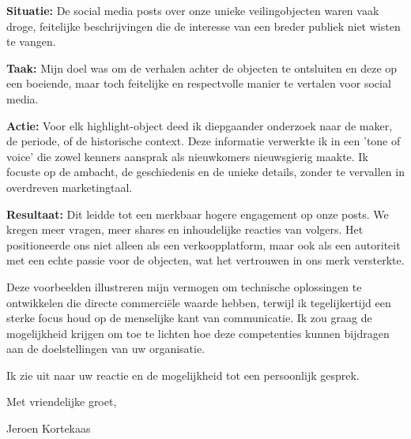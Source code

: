 \documentclass[11pt,a4paper]{article}
\begin{document}
\textbf{Situatie:} De social media posts over onze unieke veilingobjecten waren vaak droge, feitelijke beschrijvingen die de interesse van een breder publiek niet wisten te vangen.

\textbf{Taak:} Mijn doel was om de verhalen achter de objecten te ontsluiten en deze op een boeiende, maar toch feitelijke en respectvolle manier te vertalen voor social media.

\textbf{Actie:} Voor elk highlight-object deed ik diepgaander onderzoek naar de maker, de periode, of de historische context. Deze informatie verwerkte ik in een 'tone of voice' die zowel kenners aansprak als nieuwkomers nieuwsgierig maakte. Ik focuste op de ambacht, de geschiedenis en de unieke details, zonder te vervallen in overdreven marketingtaal.

\textbf{Resultaat:} Dit leidde tot een merkbaar hogere engagement op onze posts. We kregen meer vragen, meer shares en inhoudelijke reacties van volgers. Het positioneerde ons niet alleen als een verkoopplatform, maar ook als een autoriteit met een echte passie voor de objecten, wat het vertrouwen in ons merk versterkte.

\vspace{2em}

Deze voorbeelden illustreren mijn vermogen om technische oplossingen te ontwikkelen die directe commerciële waarde hebben, terwijl ik tegelijkertijd een sterke focus houd op de menselijke kant van communicatie. Ik zou graag de mogelijkheid krijgen om toe te lichten hoe deze competenties kunnen bijdragen aan de doelstellingen van uw organisatie.

Ik zie uit naar uw reactie en de mogelijkheid tot een persoonlijk gesprek.

\vspace{2em}

Met vriendelijke groet,

\vspace{3em}

Jeroen Kortekaas
\end{document}
